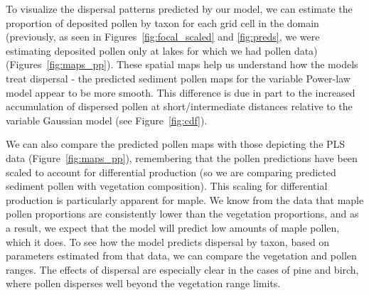 \documentclass[12pt]{article}
\begin{document}


To visualize the dispersal patterns predicted by our model, we can
estimate the proportion of deposited pollen by taxon for each grid
cell in the domain (previously, as seen in
Figures~\ref{fig:focal_scaled} and \ref{fig:preds}, we were estimating
deposited pollen only at lakes for which we had pollen data)
(Figures~\ref{fig:maps_pp}). These spatial maps help us understand how
the models treat dispersal - the predicted sediment pollen maps for
the variable Power-law model appear to be more smooth. This difference
is due in part to the increased accumulation of dispersed pollen at
short/intermediate distances relative to the variable Gaussian model
(see Figure~\ref{fig:cdf}).

We can also compare the predicted pollen maps with those depicting the
PLS data (Figure~\ref{fig:maps_pp}), remembering that the pollen
predictions have been scaled to account for differential production
(so we are comparing predicted sediment pollen with vegetation
composition). This scaling for differential production is particularly
apparent for maple. We know from the data that maple pollen
proportions are consistently lower than the vegetation proportions,
and as a result, we expect that the model will predict low amounts of
maple pollen, which it does. To see how the model predicts dispersal
by taxon, based on parameters estimated from that data, we can compare
the vegetation and pollen ranges. The effects of dispersal are
especially clear in the cases of pine and birch, where pollen
disperses well beyond the vegetation range limits.
\end{document}
